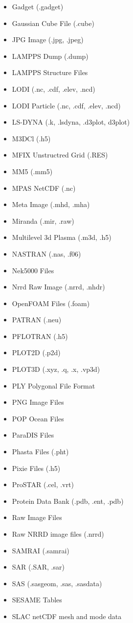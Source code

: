 \begin{itemize}
  \item Gadget (.gadget)
  \item Gaussian Cube File (.cube)
  \item JPG Image (.jpg, .jpeg)
  \item LAMPPS Dump (.dump)
  \item LAMPPS Structure Files
  \item LODI (.nc, .cdf, .elev, .ncd)
  \item LODI Particle (.nc, .cdf, .elev, .ncd)
  \item LS-DYNA (.k, .lsdyna, .d3plot, d3plot)
  \item M3DCl (.h5)
  \item MFIX Unstructred Grid (.RES)
  \item MM5 (.mm5)
  \item MPAS NetCDF (.nc)
  \item Meta Image (.mhd, .mha)
  \item Miranda (.mir, .raw)
  \item Multilevel 3d Plasma (.m3d, .h5)
  \item NASTRAN (.nas, .f06)
  \item Nek5000 Files 
  \item Nrrd Raw Image (.nrrd, .nhdr)
  \item OpenFOAM Files (.foam)
  \item PATRAN (.neu)
  \item PFLOTRAN (.h5)
  \item PLOT2D (.p2d)
  \item PLOT3D (.xyz, .q, .x, .vp3d)
  \item PLY Polygonal File Format
  \item PNG Image Files
  \item POP Ocean Files
  \item ParaDIS Files
  \item Phasta Files (.pht)
  \item Pixie Files (.h5)
  \item ProSTAR (.cel, .vrt)
  \item Protein Data Bank (.pdb, .ent, .pdb)
  \item Raw Image Files
  \item Raw NRRD image files (.nrrd)
  \item SAMRAI (.samrai) 
  \item SAR (.SAR, .sar) 
  \item SAS (.sasgeom, .sas, .sasdata) 
  \item SESAME Tables
  \item SLAC netCDF mesh and mode data

\end{itemize}
